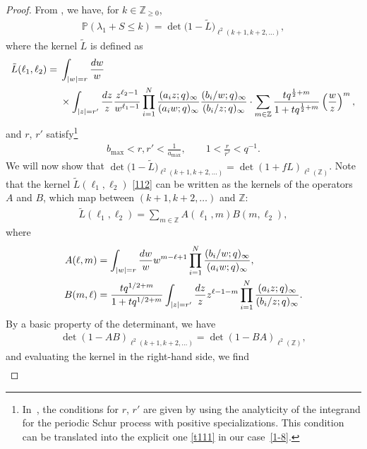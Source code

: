 \documentclass[11pt]{article}
\numberwithin{equation}{section}
\numberwithin{equation}{section}
\def\i{\infty}
\def\l{\lambda}
\def\P{\mathbb{P}}
\def\Z{\mathbb{Z}}
\begin{document}
\begin{proof}
From \cite[Theorem 2.2]{Borodin2007PeriodicSchur}, we have, for $k\in\Z_{\ge 0}$,
\begin{align*}%
\P(\l_1+S\le k)
=\det\big(1-\tilde{L}\big)_{\ell^2(k+1,k+2,\dots)},
\end{align*}
where the kernel $\tilde{L}$ is defined as
\begin{align}
\tilde{L}(\ell_1,\ell_2)={}&\int_{|w|=r}\frac{{\rm d}w}{w}\nonumber\\
&\times\int_{|z|=r'}\frac{{\rm d}z}{z}\frac{z^{\ell_2-1}}{w^{\ell_1-1}}
\prod_{i=1}^N
\frac{(a_iz;q)_\i}{(a_i w;q)_{\i}}
\frac{(b_i/w;q)_\i}{(b_i/z;q)_\i}
\cdot
\sum_{m\in \Z}
\frac{t q^{\frac12+m}}{1+t q^{\frac12+m}}
\left(\frac{w}{z}\right)^m,
\label{112}
\end{align}
and $r$, $r'$ satisfy\footnote{In~\cite{BeteaBouttier2019PeriodicSchur,Borodin2007PeriodicSchur},
the conditions for $r$, $r'$ are
given by using the analyticity
of the integrand for the periodic
Schur process with positive specializations.
This condition can be translated into
the explicit one \eqref{t111}
in our case~\eqref{1-8}.
}
\begin{align}
b_{\max}<r,r'<\frac{1}{a_{\max}},\qquad 1<\frac{r}{r'}<q^{-1}.
\label{t111}
\end{align}
We will now show that $\det\big(1-\tilde{L}\big)_{\ell^2(k+1,k+2,\dots)} =\det(1+fL)_{\ell^2(\Z)}$. Note that the kernel $\tilde{L}(\ell_1,\ell_2)$ \eqref{112} can be written as the kernels of the operators $A$ and $B$, which map between $(k+1,k+2,\dots)$ and $\mathbb{Z}$:
\begin{align*}%
\tilde{L}(\ell_1,\ell_2)=\sum_{m\in\Z}A(\ell_1,m)
B(m, \ell_2),
\end{align*}
where
\begin{align*}%
A(\ell,m)&=\int_{|w|=r}\frac{{\rm d}w}{w} w^{m-\ell+1}
\prod_{i=1}^N
\frac{(b_i/w;q)_\i}{(a_i w;q)_{\i}},
\\
B(m,\ell)&=
\frac{t q^{1/2+m}}{1+t q^{1/2+m}}
\int_{|z|=r'}\frac{{\rm d}z}{z} z^{\ell-1-m}
\prod_{i=1}^N
\frac{(a_iz;q)_\i}{(b_i/z;q)_\i}.
\end{align*}
By a basic property of the determinant, we have
\begin{align*}%
\det(1-AB)_{\ell^2(k+1,k+2,\dots)}=\det(1-BA)_{\ell^2(\Z)},
\end{align*}
and evaluating the kernel in the right-hand side, we find
\begin{gather*}%

\end{gather*}
\end{proof}
\end{document}

